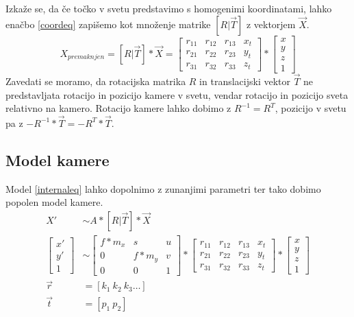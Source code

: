 \documentclass[a4paper, 12pt]{book}
\begin{document}
Izkaže se, da če točko v svetu predstavimo s homogenimi koordinatami, lahko enačbo \eqref{coordeq} zapišemo kot množenje matrike $[R | \vec{T}]$ z vektorjem $\vec{X}$.
\begin{equation}
X_{premaknjen} = [R|\vec{T}] * \vec{X} = 
\begin{bmatrix}
r_{11} & r_{12} & r_{13} & x_t\\
r_{21} & r_{22} & r_{23} & y_t\\
r_{31} & r_{32} & r_{33} & z_t
\end{bmatrix}
* 
\begin{bmatrix}
x \\
y \\
z \\
1
\end{bmatrix}
\label{coordeq}
\end{equation}
Zavedati se moramo, da rotacijska matrika $R$ in translacijski vektor $\vec{T}$ ne predstavljata rotacijo in pozicijo kamere v svetu, vendar rotacijo in pozicijo sveta relativno na kamero. Rotacijo kamere lahko dobimo z $R^{-1} = R^T$, pozicijo v svetu pa z $-R^{-1} * \vec{T} = -R^T * \vec{T}$.

\subsection{Model kamere}

Model \eqref{internaleq} lahko dopolnimo z zunanjimi parametri ter tako dobimo popolen model kamere.
\begin{align}
X' &\sim A * [R | \vec{T}] * \vec{X} \\
\begin{bmatrix}
x' \\
y' \\
1
\end{bmatrix}
&\sim
\begin{bmatrix}
f*m_x & s & u \\
0 & f*m_y & v \\
0 & 0 & 1
\end{bmatrix}
*
\begin{bmatrix}
r_{11} & r_{12} & r_{13} & x_t\\
r_{21} & r_{22} & r_{23} & y_t\\
r_{31} & r_{32} & r_{33} & z_t
\end{bmatrix}
*
\begin{bmatrix}
x \\
y \\
z \\
1
\end{bmatrix} \\
\vec{r} &= [k_1 \ k_2 \ k_3 \dots] \\
\vec{t} &= [p_1 \ p_2]
\label{internaleq}
\end{align}
\end{document}
